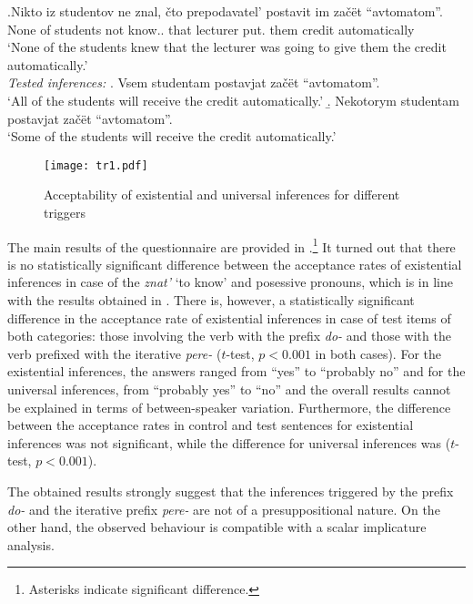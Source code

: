 \exg.\label{ex:znat}Nikto iz studentov ne znal, \v{c}to prepodavatel' postavit im za\v{c}\"{e}t ``avtomatom''.\\
None of students not know.. that lecturer put. them credit automatically\\
\trans `None of the students knew that the lecturer was going to give them the credit automatically.'\smallskip\\
\textit{Tested inferences:}
\a. Vsem studentam postavjat za\v{c}\"et ``avtomatom''.\\
 `All of the students will receive the credit automatically.'
\b. Nekotorym studentam postavjat za\v{c}\"et ``avtomatom''.\\
 `Some of the students will receive the credit automatically.'

\begin{figure}
\texttt{[image: tr1.pdf]}
\caption{Acceptability of existential and universal inferences for different triggers}
\label{fig:results}
\end{figure}

The main results of the questionnaire are provided in .\footnote{Asterisks indicate significant difference.} It turned out that there is no statistically significant difference between the acceptance rates of  existential inferences in case of the  \textit{znat'} `to know' and posessive pronouns, which is in line with the results obtained in \citealt{Chemla:09}. There is, however, a statistically significant difference in the acceptance rate of  existential inferences in case of test items of both categories: those involving the verb with the  prefix \textit{do-} and those with the verb prefixed with the iterative \textit{pere-} ($t$-test, $p<0.001$ in both cases). For the existential inferences, the answers ranged from ``yes'' to ``probably no'' and for the universal inferences, from ``probably yes'' to ``no'' and the overall results cannot be explained in terms of between-speaker variation. Furthermore, the difference between the acceptance rates in control and
test sentences for existential inferences was not significant, while the
difference for universal inferences was ($t$-test, $p<0.001$).

The obtained results strongly suggest that the inferences triggered by the  prefix \textit{do-} and the iterative prefix \textit{pere-} are not of a presuppositional nature. On the other hand, the observed behaviour is compatible with a scalar implicature analysis.

